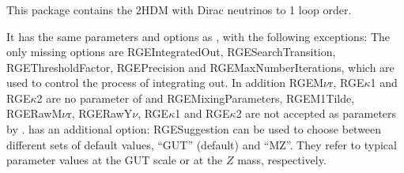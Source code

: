 \documentclass[10pt,a4paper,twoside]{scrartcl}
\begin{document}
\subsubsection[\package{RGE2HDMDirac}]{}
This package contains the 2HDM with Dirac neutrinos to 1 loop order.

\vspace{2ex} It has the same parameters and options as
, with the following exceptions: The
only missing options are RGEIntegratedOut, RGESearchTransition,
RGEThresholdFactor, RGEPrecision and RGEMaxNumberIterations, which are used to
control the process of integrating out.  In addition RGEM$\nu$r, RGE$\kappa$1
and RGE$\kappa$2 are no parameter of  and
RGEMixingParameters, RGEM1Tilde, RGERawM$\nu$r,
RGERawY$\nu$, RGE$\kappa$1 and RGE$\kappa$2 are not accepted as parameters by
.
 has an additional option: RGESuggestion can be
used to choose between different sets of default values, ``GUT''
(default) and ``MZ''.  They refer to typical parameter values at the GUT
scale or at the $Z$ mass, respectively.


%






\end{document}
